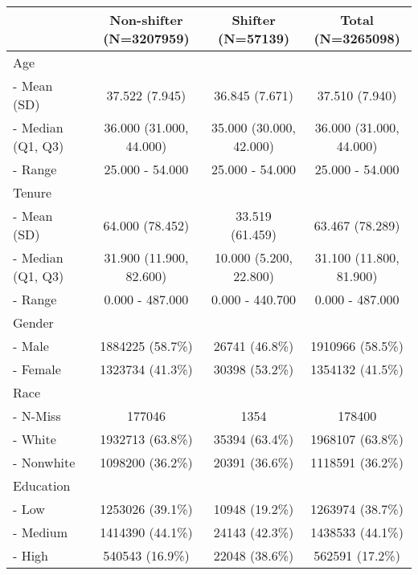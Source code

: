 \documentclass[]{article}
\title{}
\author{}
\date{}
\begin{document}
\begin{longtable}[c]{@{}lccc@{}}
\toprule
& Non-shifter (N=3207959) & Shifter (N=57139) & Total
(N=3265098)\tabularnewline
\midrule
\endhead
Age & & &\tabularnewline
- Mean (SD) & 37.522 (7.945) & 36.845 (7.671) & 37.510
(7.940)\tabularnewline
- Median (Q1, Q3) & 36.000 (31.000, 44.000) & 35.000 (30.000, 42.000) &
36.000 (31.000, 44.000)\tabularnewline
- Range & 25.000 - 54.000 & 25.000 - 54.000 & 25.000 -
54.000\tabularnewline
Tenure & & &\tabularnewline
- Mean (SD) & 64.000 (78.452) & 33.519 (61.459) & 63.467
(78.289)\tabularnewline
- Median (Q1, Q3) & 31.900 (11.900, 82.600) & 10.000 (5.200, 22.800) &
31.100 (11.800, 81.900)\tabularnewline
- Range & 0.000 - 487.000 & 0.000 - 440.700 & 0.000 -
487.000\tabularnewline
Gender & & &\tabularnewline
- Male & 1884225 (58.7\%) & 26741 (46.8\%) & 1910966
(58.5\%)\tabularnewline
- Female & 1323734 (41.3\%) & 30398 (53.2\%) & 1354132
(41.5\%)\tabularnewline
Race & & &\tabularnewline
- N-Miss & 177046 & 1354 & 178400\tabularnewline
- White & 1932713 (63.8\%) & 35394 (63.4\%) & 1968107
(63.8\%)\tabularnewline
- Nonwhite & 1098200 (36.2\%) & 20391 (36.6\%) & 1118591
(36.2\%)\tabularnewline
Education & & &\tabularnewline
- Low & 1253026 (39.1\%) & 10948 (19.2\%) & 1263974
(38.7\%)\tabularnewline
- Medium & 1414390 (44.1\%) & 24143 (42.3\%) & 1438533
(44.1\%)\tabularnewline
- High & 540543 (16.9\%) & 22048 (38.6\%) & 562591
(17.2\%)\tabularnewline
\bottomrule
\end{longtable}
\end{document}
